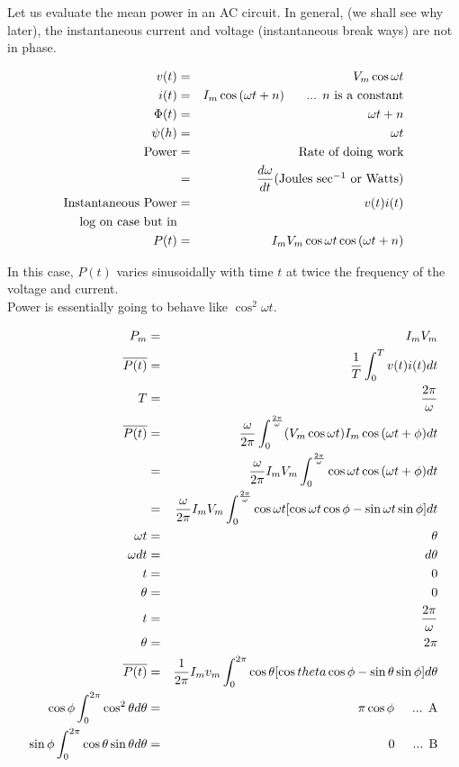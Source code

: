\documentclass[a4paper,12pt]{article}
\begin{document}
Let us evaluate the mean power in an AC circuit. In general,
(we shall see why later), the instantaneous current and voltage
(instantaneous break ways) are not in phase.

\begin{eqnarray*}
		v(t) & = & V_{m} \cos{\omega t} \\
		i(t) & = & I_{m} \cos{(\omega t + n)} \mbox{ \hspace{5mm}... $n$ is a
		constant}\\		
	\Phi(t) & = & \omega t + n \\
  \psi (h) & = & \omega t \\
\mbox{Power} & = & \mbox{Rate of doing work} \\
				 & = & \frac{d \omega}{dt} \mbox{(Joules sec$^{-1}$ or
				 Watts)} \\
\mbox{Instantaneous Power} & = & v(t) i(t) \\
\mbox{log on case but in} & & \\
		  P(t) & = & I_{m}V_{m} \cos{\omega t} \cos{(\omega t + n)} 
\end{eqnarray*}

In this case, $P(t)$ varies sinusoidally with time $t$ at 
twice the frequency of the voltage and current. \\

Power is essentially going to behave like $\cos^{2}{\omega
t}$.

\begin{eqnarray*}
		 	 P_{m} & = & I_{m} V_{m} \\
\overline{P(t)} & = & \frac{1}{T} \int^{T}_{0} v(t) i(t) dt \\
				T	 & = & \frac{2 \pi}{\omega} \\
\overline{P(t)} & = & \frac{\omega}{2 \pi} \int^{\frac{2
\pi}{\omega}}_{0} (V_{m} \cos{\omega t}) I_{m}\cos{(\omega t + \phi)} dt \\
					 & = &\frac{\omega}{2 \pi} I_{m}V_{m} \int^{\frac{2
					 \pi}{\omega}}_{0} \cos{\omega t} \cos{(\omega t +
					 \phi)}dt \\
					 & = & \frac{\omega}{2 \pi} I_{m} V_{m} \int^{\frac{2
					 \pi}{\omega}}_{0} \cos{\omega t} [ \cos{\omega
					 t}\cos{\phi} - \sin{\omega t}\sin{\phi}]dt \\
\omega t			 & = & \theta \\
\omega dt		 & = & d \theta \\
t					 & = & 0 \\
\theta			 & = & 0 \\
t					 & = & \frac{2 \pi}{\omega} \\
\theta			 & = & 2 \pi \\
\overline{P(t)} & = & \frac{1}{2 \pi} I_{m}v_{m} \int^{2 \pi}_{0}
\cos{\theta}[\cos{theta}\cos{\phi} - \sin{\theta}\sin{\phi}] d \theta \\
\cos{\phi} \int^{2 \pi}_{0} \cos^{2}{\theta} d \theta 
					 & = & \pi \cos{\phi} \mbox{\hspace{5mm}... A} \\
\sin{\phi} \int^{2 \pi}_{0} \cos{\theta} \sin{\theta} d \theta
					 & = & 0 \mbox{\hspace{5mm}... B} \\
\end{eqnarray*}
\end{document}
